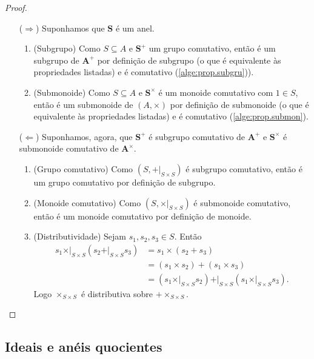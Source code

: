 \begin{proof}
	\begin{itemize}
	\item [($\Rightarrow$)] Suponhamos que $\bm S$ é um anel.
		\begin{enumerate}
		\item (Subgrupo) Como $S \subseteq A$ e $\bm S^+$ um grupo comutativo, então é um subgrupo de $\bm A^+$ por definição de subgrupo (o que é equivalente às propriedades listadas) e é comutativo (\ref{alge:prop.subgru})).
		
		\item (Submonoide)  Como $S \subseteq A$ e $\bm S^\times$ é um monoide comutativo com $1 \in S$, então é um submonoide de $(A,\times)$ por definição de submonoide (o que é equivalente às propriedades listadas) e é comutativo (\ref{alge:prop.submon}).
		\end{enumerate}

	\item [($\Leftarrow$)] Suponhamos, agora, que $\bm S^+$ é subgrupo comutativo de $\bm A^+$ e $\bm S^\times$ é submonoide comutativo de $\bm A^\times$.
		\begin{enumerate}
		\item (Grupo comutativo) Como $(S,+|_{S \times S})$ é subgrupo comutativo, então é um grupo comutativo por definição de subgrupo.
		
		\item (Monoide comutativo) Como $(S,\times|_{S \times S})$ é submonoide comutativo, então é um monoide comutativo por definição de monoide.
		
		\item (Distributividade) Sejam $s_1,s_2,s_3 \in S$. Então
	\begin{align*}
	s_1 \mathrel{\times|_{S \times S}} (s_2 \mathrel{+|_{S \times S}} s_3) &= s_1 \times (s_2 + s_3) \\
		&= (s_1 \times s_2) + (s_1 \times s_3) \\
		&= (s_1 \mathrel{\times|_{S \times S}} s_2) \mathrel{+|_{S \times S}} (s_1 \mathrel{\times|_{S \times S}} s_3).
	\end{align*}
Logo $\times_{S \times S}$ é distributiva sobre $+ \times_{S \times S}$.
		\end{enumerate}
	\end{itemize}
\end{proof}

\subsection{Ideais e anéis quocientes}

